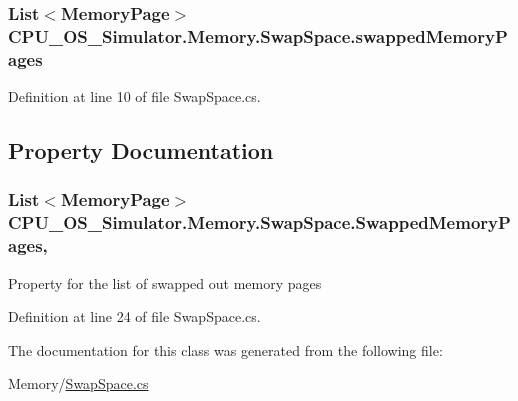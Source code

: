 \subsubsection[{swapped\+Memory\+Pages}]{\setlength{\rightskip}{0pt plus 5cm}List$<${\bf Memory\+Page}$>$ C\+P\+U\+\_\+\+O\+S\+\_\+\+Simulator.\+Memory.\+Swap\+Space.\+swapped\+Memory\+Pages\hspace{0.3cm}{\ttfamily [private]}}\label{class_c_p_u___o_s___simulator_1_1_memory_1_1_swap_space_ad991c315222ab7bf7fafd562d6fe8014}


Definition at line 10 of file Swap\+Space.\+cs.



\subsection{Property Documentation}
\hypertarget{class_c_p_u___o_s___simulator_1_1_memory_1_1_swap_space_a83c049a398bcff3c29f809b02ed3f782}{}
\subsubsection[{Swapped\+Memory\+Pages}]{\setlength{\rightskip}{0pt plus 5cm}List$<${\bf Memory\+Page}$>$ C\+P\+U\+\_\+\+O\+S\+\_\+\+Simulator.\+Memory.\+Swap\+Space.\+Swapped\+Memory\+Pages\hspace{0.3cm}{\ttfamily [get]}, {\ttfamily [set]}}\label{class_c_p_u___o_s___simulator_1_1_memory_1_1_swap_space_a83c049a398bcff3c29f809b02ed3f782}


Property for the list of swapped out memory pages 



Definition at line 24 of file Swap\+Space.\+cs.



The documentation for this class was generated from the following file\+:\begin{DoxyCompactItemize}
\item 
Memory/\hyperlink{_swap_space_8cs}{Swap\+Space.\+cs}\end{DoxyCompactItemize}
